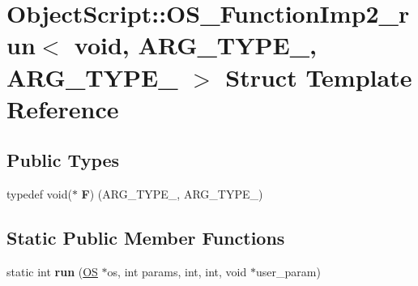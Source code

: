 \hypertarget{struct_object_script_1_1_o_s___function_imp2__run_3_01void_00_01_01_01_a_r_g___t_y_p_e__1_00_01_a_r_g___t_y_p_e__2_01_4}{}\section{Object\+Script\+:\+:O\+S\+\_\+\+Function\+Imp2\+\_\+run$<$ void, A\+R\+G\+\_\+\+T\+Y\+P\+E\+\_, A\+R\+G\+\_\+\+T\+Y\+P\+E\+\_ $>$ Struct Template Reference}
\label{struct_object_script_1_1_o_s___function_imp2__run_3_01void_00_01_01_01_a_r_g___t_y_p_e__1_00_01_a_r_g___t_y_p_e__2_01_4}
\subsection*{Public Types}
\begin{DoxyCompactItemize}
\item 
typedef void($\ast$ {\bfseries F}) (A\+R\+G\+\_\+\+T\+Y\+P\+E\+\_, A\+R\+G\+\_\+\+T\+Y\+P\+E\+\_)\hypertarget{struct_object_script_1_1_o_s___function_imp2__run_3_01void_00_01_01_01_a_r_g___t_y_p_e__1_00_01_a_r_g___t_y_p_e__2_01_4_af9dfc770d701d8cb7dc2ae5ced137c19}{}\label{struct_object_script_1_1_o_s___function_imp2__run_3_01void_00_01_01_01_a_r_g___t_y_p_e__1_00_01_a_r_g___t_y_p_e__2_01_4_af9dfc770d701d8cb7dc2ae5ced137c19}

\end{DoxyCompactItemize}
\subsection*{Static Public Member Functions}
\begin{DoxyCompactItemize}
\item 
static int {\bfseries run} (\hyperlink{class_object_script_1_1_o_s}{OS} $\ast$os, int params, int, int, void $\ast$user\+\_\+param)\hypertarget{struct_object_script_1_1_o_s___function_imp2__run_3_01void_00_01_01_01_a_r_g___t_y_p_e__1_00_01_a_r_g___t_y_p_e__2_01_4_a483d97c21e37bc62aaf283d1f3288f6f}{}\label{struct_object_script_1_1_o_s___function_imp2__run_3_01void_00_01_01_01_a_r_g___t_y_p_e__1_00_01_a_r_g___t_y_p_e__2_01_4_a483d97c21e37bc62aaf283d1f3288f6f}

\end{DoxyCompactItemize}



